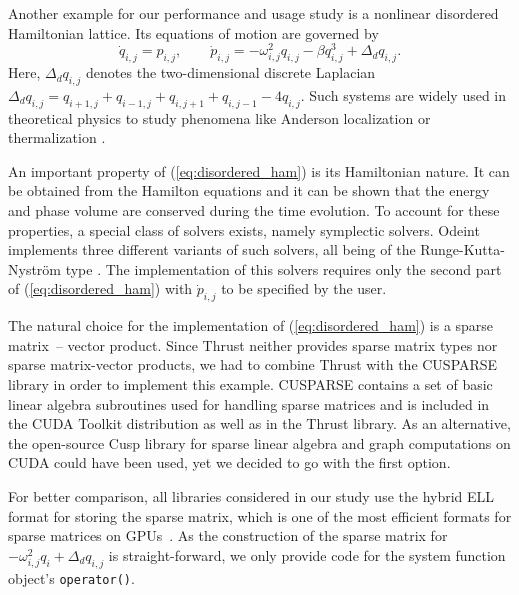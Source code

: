 \documentclass[final]{siamltex}
\newcommand{\code}[1]{\lstinline|#1|}
\newcommand{\eqref}[1]{(\ref{#1})}
\begin{document}
Another example for our performance and usage study is a 
nonlinear disordered Hamiltonian lattice\cite{mulansky_scaling_2012}. Its equations of motion are
governed by
\begin{equation}
\dot{q}_{i,j} = p_{i,j}, \quad \quad
\dot{p}_{i,j} = - \omega_{i,j}^2 q_{i,j} - \beta q_{i,j}^3 + \Delta_d q_{i,j}.
\label{eq:disordered_ham}
\end{equation}
Here, $\Delta_d q_{i,j}$ denotes the two-dimensional discrete Laplacian
$\Delta_d
q_{i,j}=q_{i+1,j}+q_{i-1,j}+q_{i,j+1}+q_{i,j-1}-4q_{i,j}$. Such
systems are widely used in theoretical physics to study phenomena
like Anderson localization \cite{Sheng-06} or thermalization \cite{FPUScholarpedia}. 

An important property of \eqref{eq:disordered_ham} is its Hamiltonian
nature. It can be obtained from the Hamilton equations and it can be
shown that the energy and phase volume are conserved during the time
evolution. To account for these properties, a special class of solvers
exists, namely symplectic solvers. Odeint implements three different
variants of such solvers, all being of the Runge-Kutta-Nystr\"om
type \cite{HairerGeometricNumericalIntegration2006,Leimkuhler-Reich-04}. The implementation of this solvers requires only the second part
of \eqref{eq:disordered_ham} with $\dot{p}_{i,j}$ to be specified by
the user.



The natural choice for the implementation of \eqref{eq:disordered_ham} is a
sparse matrix~-- vector product. Since Thrust neither provides sparse
matrix types nor sparse matrix-vector products, we had to combine
Thrust with the CUSPARSE library in order to implement this example. CUSPARSE    %
contains a set of basic linear algebra subroutines used for handling sparse
matrices and is included in the CUDA Toolkit distribution as well as in the Thrust
library. As an alternative, the open-source Cusp library \cite{CuspRef} for sparse linear algebra
and graph computations on CUDA could have been used, yet we decided to go with the first option.


For better comparison, all libraries considered in our study use the hybrid
ELL format for storing the sparse matrix, which is one of the most efficient
formats for sparse matrices on GPUs~\cite{BellGarland2008}.
As the construction of the sparse matrix for $- \omega_{i,j}^2 q_i + \Delta_d q_{i,j}$ is
straight-forward, we only provide code for the system function object's
\code{operator()}.
\end{document}
